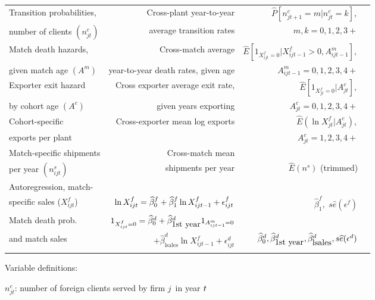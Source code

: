 \begin{table}[tbp]
{\begin{tabular}{lrrr}
Transition probabilities, & Cross-plant year-to-year & $\widehat{P}%
[n_{jt+1}^{c}=m|n_{jt}^{c}=k],$ \\ 
number of clients $(n_{jt}^{c})$ & average transition rates & $m,k=0,1,2,3+$
\\ \noalign{\smallskip} \hline \noalign{\smallskip}
Match death hazards, & Cross-match average & $\widehat{E}%
[1_{X_{ijt}^{f}=0}|X_{ijt-1}^{f}>0,A_{ijt-1}^{m}],$ \\ 
given match age $(A^{m})$ & year-to-year death rates, given age & $%
A_{ijt-1}^{m}=0,1,2,3,4+$ \\ \noalign{\smallskip} \hline \noalign{\smallskip}
Exporter exit hazard & Cross exporter average exit rate, & $\widehat{E}%
[1_{X_{jt}^{f}=0}|A_{jt}^{c}],$ \\ 
by cohort age $(A^{c})$ & given years exporting & $A_{jt}^{c}=0,1,2,3,4+$ \\ \noalign{\smallskip} \hline \noalign{\smallskip}
Cohort-specific & Cross-exporter mean log exports & $\widehat{E}(\ln
X_{jt}^{f}|A_{jt}^{c}),$ \\ 
exports per plant &  & $A_{jt}^{c}=1,2,3,4+$ \\ \noalign{\smallskip} \hline \noalign{\smallskip}
Match-specific shipments & Cross-match mean &  \\ 
per year $(n_{ijt}^{s})$ & shipments per year & $\widehat{E}\left(n^{s}\right) $ (trimmed) \\ \noalign{\smallskip} \hline \noalign{\smallskip}
Autoregression, match- &  & \\
specific sales ($X_{ijt}^{f}$) & $\ln X_{ijt}^{f}=\widehat{\beta }_{0}^{f}+\widehat{%
\beta }_{1}^{f}\ln X_{ijt-1}^{f}+\epsilon _{ijt}^{f}$ & $\widehat{\beta }_{1}^{f},$ $s\widehat{e}(\epsilon ^{f})$ \\ \noalign{\smallskip} \hline \noalign{\smallskip}
Match death prob. & $1_{X_{ijt}^{f}=0}=\widehat{\beta }_{0}^{d}+\widehat{%
\beta }_{\mbox{1st year}}^{d}1_{A_{ijt-1}^{m}=0}$ &  \\ \noalign{\smallskip}
and match sales & $+\widehat{\beta }_{\mbox{lsales}}^{d}\ln
X_{ijt-1}^{f}+\epsilon _{ijt}^{d}$ & $\widehat{\beta }_{0}^{d},\widehat{\beta }_{\mbox{1st year}}^{d},\widehat{\beta }_{%
\mbox{lsales}}^{d},s\widehat{e}(\epsilon ^{d})$ \\ \noalign{\smallskip} \hline \noalign{\smallskip}
\end{tabular}%
\newline\flushleft\small{\small Variable definitions: }

$n_{jt}^{c}${\small : number of foreign clients served by firm }$j${\small \ in year }${\small t}${\small \ }

}
\end{table}
